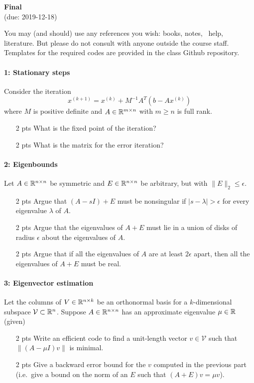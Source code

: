 \documentclass[12pt, leqno]{article} %
\begin{document}
\pagestyle{fancy}
\fancyfoot{}
\begin{center}
  {\large{\bf Final}} \\ (due: 2019-12-18)
\end{center}

You may (and should) use any references you wish: books, notes,
\matlab\ help, literature.  But please do not consult with anyone
outside the course staff.  Templates for the required codes are
provided in the class Github repository.


\paragraph*{1: Stationary steps}
Consider the iteration
\[
  x^{(k+1)} = x^{(k)} + M^{-1} A^T (b-Ax^{(k)}) 
\]
where $M$ is positive definite and $A \in \mathbb{R}^{m \times n}$ with $m
\geq n$ is full rank.
\begin{itemize}
\item[2 pts] What is the fixed point of the iteration?
\item[2 pts] What is the matrix for the error iteration?
\end{itemize}

\paragraph*{2: Eigenbounds}
Let $A \in \mathbb{R}^{n \times n}$ be symmetric and
$E \in \mathbb{R}^{n \times n}$ be arbitrary, but with $\|E\|_2 \leq
\epsilon$.
\begin{itemize}
\item[2 pts] Argue that $(A-sI) + E$ must be nonsingular if
  $|s-\lambda| > \epsilon$ for every eigenvalue $\lambda$ of $A$.
\item[2 pts] Argue that the eigenvalues of $A+E$ must lie in a union
  of disks of radius $\epsilon$ about the eigenvalues of $A$.
\item[2 pts] Argue that if all the eigenvalues of $A$ are at least $2
  \epsilon$ apart, then all the eigenvalues of $A+E$ must be real.
\end{itemize}

\paragraph*{3: Eigenvector estimation}
Let the columns of $V \in \mathbb{R}^{n \times k}$ be an orthonormal basis
for a $k$-dimensional subspace $\mathcal{V} \subset \mathbb{R}^n$.
Suppose $A \in \mathbb{R}^{n \times n}$ has an approximate eigenvalue $\mu
\in \mathbb{R}$ (given)
\begin{itemize}
\item[2 pts] Write an efficient code to find a unit-length vector
  $v \in \mathcal{V}$ such that $\|(A-\mu I)v\|$ is minimal.
\item[2 pts] Give a backward error bound for the $v$ computed in
  the previous part (i.e.~give a bound on the norm of an $E$ such that
  $(A+E) v = \mu v$).
\end{itemize}
\end{document}
